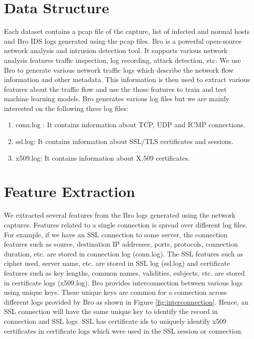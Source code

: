 \section{Data Structure}

Each dataset contains a pcap file of the capture, list of infected and normal hosts and Bro IDS logs generated using the pcap files. Bro \cite{Bro} is a powerful open-source network analysis and intrusion detection tool. It supports various network analysis features traffic inspection, log recording, attack detection, etc. We use Bro to generate various network traffic logs which describe the network flow information and other metadata. This information is then used to extract various features about the traffic flow and use the those features to train and test machine learning models. Bro generates various log files but we are mainly interested on the following three log files:

\begin{enumerate}
	\item conn.log : It contains information about TCP, UDP and ICMP connections.
	\item ssl.log: It contains information about SSL/TLS certificates and sessions.
	\item x509.log: It contains information about X.509 certificates.
\end{enumerate}

\section{Feature Extraction}

We extracted several features from the Bro logs generated using the network captures. Features related to a single connection is spread over different log files. For example, if we have an SSL connection to some server, the connection features such as source, destination IP addresses, ports, protocols, connection duration, etc. are stored in connection log (conn.log). The SSL features such as cipher used,  server name, etc. are stored in SSL log (ssl.log) and certificate features such as key lengths, common names, validities, subjects, etc. are stored in certificate logs (x509.log). Bro provides interconnection between various logs using unique keys. These unique keys are common for a connection across different logs provided by Bro as shown in Figure \ref{fig:interconnection}. Hence, an SSL connection will have the same unique key to identify the record in connection and SSL logs. SSL has certificate ids to uniquely identify x509 certificates in certificate logs which were used in the SSL session or connection.

